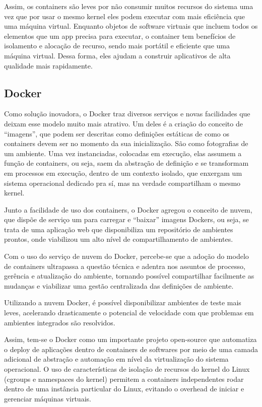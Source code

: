 Assim, os containers são leves por não consumir muitos recursos do 
sistema uma vez que por usar o mesmo kernel eles podem executar com 
mais eficiência que uma máquina virtual. Enquanto objetos de software 
virtuais que incluem todos os elementos que um app precisa para executar, 
o container tem benefícios de isolamento e alocação de recurso, sendo 
mais portátil e eficiente que uma máquina virtual. Dessa forma, eles 
ajudam a construir aplicativos de alta qualidade mais rapidamente.

\subsection{Docker}
Como solução inovadora, o Docker traz diversos serviços e novas 
facilidades que deixam esse modelo muito mais atrativo. Um deles 
é a criação do conceito de “imagens”, que podem ser descritas como 
definições estáticas de como os containers devem ser no momento da 
sua inicialização. São como fotografias de um ambiente. Uma vez 
instanciadas, colocadas em execução, elas assumem a função de 
containers, ou seja, saem da abstração de definição e se transformam 
em processos em execução, dentro de um contexto isolado, que 
enxergam um sistema operacional dedicado pra sí, mas na verdade 
compartilham o mesmo kernel.

Junto a facilidade de uso dos containers, o Docker agregou o 
conceito de nuvem, que dispõe de serviço um para carregar e 
“baixar” imagens Dockers, ou seja, se trata de uma aplicação 
web que disponibiliza um repositório de ambientes prontos, 
onde viabilizou um alto nível de compartilhamento de ambientes.

Com o uso do serviço de nuvem do Docker, percebe-se que a 
adoção do modelo de containers ultrapassa a questão técnica 
e adentra nos assuntos de processo, gerência e atualização 
do ambiente, tornando possível compartilhar facilmente as 
mudanças e viabilizar uma gestão centralizada das definições 
de ambiente.

Utilizando a nuvem Docker, é possível disponibilizar ambientes de 
teste mais leves, acelerando drasticamente o potencial de velocidade 
com que problemas em ambientes integrados são resolvidos.

Assim, tem-se o Docker como um importante projeto open-source 
que automatiza o deploy de aplicações dentro de containers de 
softwares por meio de uma camada adicional de abstração e automação 
em nível da virtualização do sistema operacional. O uso de 
características de isolação de recursos do kernel do Linux 
(cgroups e namespaces do kernel) permitem a containers 
independentes rodar dentro de uma instância particular do Linux, 
evitando o overhead de iniciar e gerenciar máquinas virtuais.
